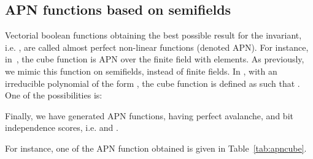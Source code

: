 \documentclass{article}\usepackage{amsthm}
\begin{document}
\subsection{APN functions based on semifields}
Vectorial boolean functions obtaining the best possible result for the  invariant,
i.e. , are called almost perfect non-linear functions (denoted APN). For instance,
in~\cite{Alvarez:2008:apn}, the cube
function is APN over the finite field with  elements. As previously, we mimic this function on
semifields, instead of finite fields. In , with  an irreducible polynomial of the form
, the cube function is defined as  such that . One of the possibilities is: 


Finally, we have generated  APN functions,  having perfect avalanche,
and bit independence scores, i.e.  and .

For instance, one of the APN function obtained is given in Table~\ref{tab:apncube}.
\end{document}
